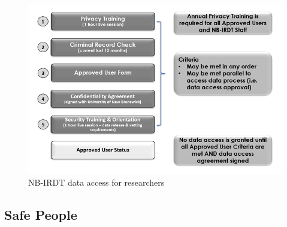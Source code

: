 \documentclass[
]{book}
\begin{document}
\begin{figure}
\includegraphics[width=1\linewidth]{./assets/nbirdt/nbirdtfigure3web} \caption{NB-IRDT data access for researchers}\label{fig:nbirdtfigure3}
\end{figure}

\hypertarget{safe-people-2}{%
\subsection{Safe People}\label{safe-people-2}}
\end{document}
